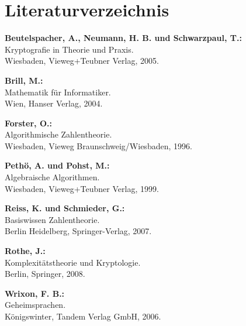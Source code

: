 \section{Literaturverzeichnis}

\textbf{Beutelspacher, A., Neumann, H. B. und Schwarzpaul, T.:}\\
Kryptografie in Theorie und Praxis.\\
Wiesbaden, Vieweg+Teubner Verlag, 2005.

\textbf{Brill, M.:}\\
Mathematik für Informatiker.\\
Wien, Hanser Verlag, 2004.

\textbf{Forster, O.:}\\
Algorithmische Zahlentheorie.\\
Wiesbaden, Vieweg Braunschweig/Wiesbaden, 1996.

\textbf{Pethö, A. und Pohst, M.:}\\
Algebraische Algorithmen.\\
Wiesbaden, Vieweg+Teubner Verlag, 1999.

\textbf{Reiss, K. und Schmieder, G.:}\\
Basiswissen Zahlentheorie.\\
Berlin Heidelberg, Springer-Verlag, 2007.

\textbf{Rothe, J.:}\\
Komplexitätstheorie und Kryptologie.\\
Berlin, Springer, 2008.

\textbf{Wrixon, F. B.:}\\
Geheimsprachen.\\
Königswinter, Tandem Verlag GmbH, 2006.

\newpage
